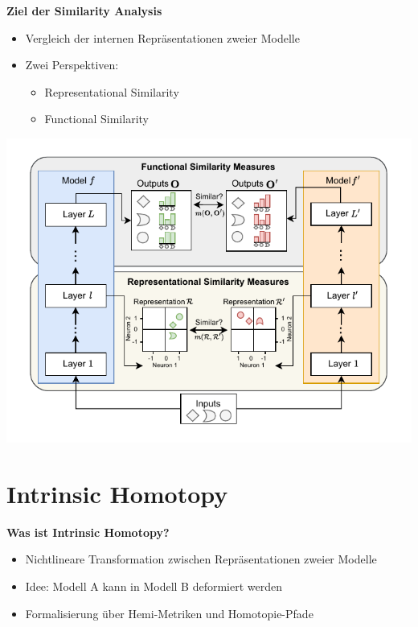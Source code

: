 \begin{frame}
	
	\begin{minipage}[t]{0.49\linewidth}
		\vspace*{-0.5em}
		{\raggedright
			\textbf{\normalsize Ziel der Similarity Analysis} \\[1em]
			\begin{itemize}
				\item Vergleich der internen Repräsentationen zweier Modelle
				\item Zwei Perspektiven:
				\begin{itemize}
					\item Representational Similarity
					\item Functional Similarity
				\end{itemize}
			\end{itemize}
		}
	\end{minipage}
	\hfill
	\begin{minipage}[t]{0.48\linewidth}
		\vspace*{-0.5em}
		\includegraphics[width=\linewidth]{BilderPräsentation/Similarity90Deg.drawio.pdf}
	\end{minipage}
	
\end{frame}



\section{Intrinsic Homotopy}
\begin{frame}
	\textbf{Was ist Intrinsic Homotopy?}\\
	\begin{itemize}
		\item Nichtlineare Transformation zwischen Repräsentationen zweier Modelle
		\item Idee: Modell A kann in Modell B deformiert werden
		\item Formalisierung über Hemi-Metriken und Homotopie-Pfade
	\end{itemize}
\end{frame}

